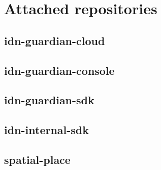 \chapter{Attached repositories}

\section*{idn-guardian-cloud}

\section*{idn-guardian-console}

\section*{idn-guardian-sdk}

\section*{idn-internal-sdk}

\section*{spatial-place}
